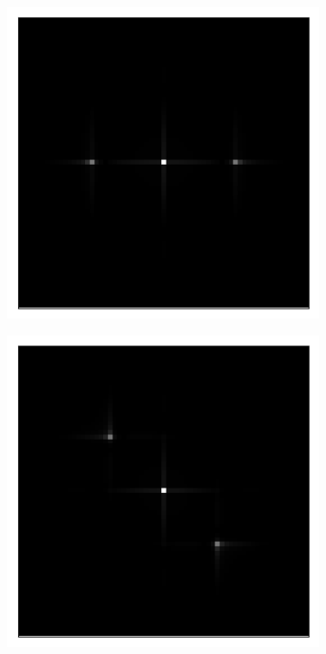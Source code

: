 \begin{figure}[h]
	\begin{subfigure}[t]{0.3\textwidth}
		\centering
		\includegraphics[width=\linewidth]{images/fringes_1_ft_kx_16_ky_0.png}
		\caption{}
		\label{fig:fringes_1_ft}
	\end{subfigure}
	\begin{subfigure}[t]{0.3\textwidth}
		\centering
		\includegraphics[width=\linewidth]{images/fringes_2_ft_kx_12_ky_12.png}

\end{subfigure}
\end{figure}
